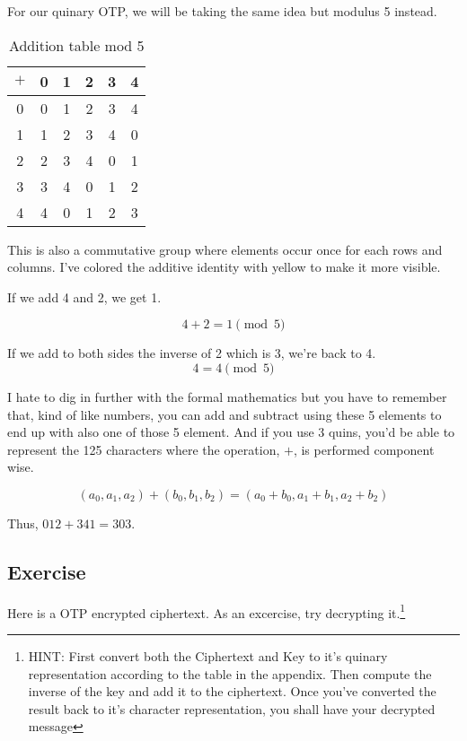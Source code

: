 \documentclass{article}
\begin{document}

For our quinary OTP, we will be taking the same idea but modulus 5 instead.

\begin{table}[!hp]
\centering
  \begin{tabular}{c|ccccc}
  $+$ & 0 & 1 & 2 & 3 & 4\\
  \hline
  0 & \cellcolor{yellow!50}0 & 1 & 2 & 3 & 4 \\
  1 & 1 & 2 & 3 & 4 & \cellcolor{yellow!50}0\\
  2 & 2 & 3 & 4 & \cellcolor{yellow!50}0 & 1 \\
  3 & 3 & 4 & \cellcolor{yellow!50}0 & 1 & 2 \\
  4 & 4 & \cellcolor{yellow!50}0 & 1 & 2 & 3 \\
\end{tabular}
  \caption{Addition table mod 5}
\end{table}


This is also a commutative group where elements occur once
for each rows and
columns. I've colored the additive identity with yellow to
make it more visible.

If we add  4 and 2, we get 1.


\[ 4 + 2 = 1 \pmod 5 \]

If we add to both sides the inverse of 2 which is 3, we're back to
4.
\[ 4 = 4\pmod 5 \]

I hate to dig in further with the formal mathematics but you have
to remember that, kind of like numbers, you can add and subtract using these 5 elements
to end up with also one of those 5 element. And if you use 3 quins, you'd be able to represent
the 125 characters where the operation, \( + \), is performed component wise.

\[ (a_0,a_1,a_2) + (b_0,b_1,b_2) = (a_0+b_0,a_1+b_1,a_2+b_2)\]

Thus, $012+341 = 303$.

\subsection{Exercise}

Here is a OTP encrypted ciphertext. As an excercise, try decrypting it.\footnote{HINT: First convert both the Ciphertext and Key to it's quinary representation according to the table in the appendix. Then compute
the inverse of the key and add it to the ciphertext. Once you've
converted the result back to it's character representation, you shall have
your decrypted message}
\end{document}

